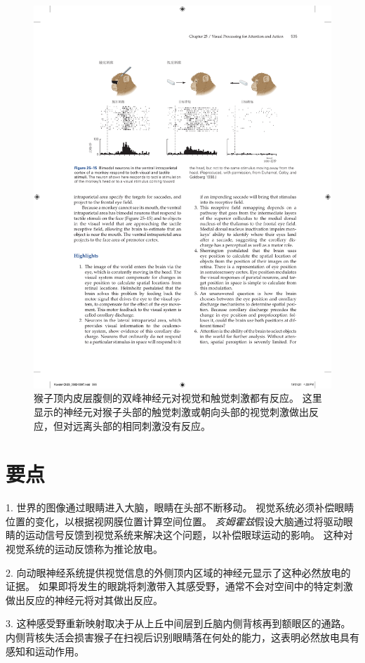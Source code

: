 \begin{figure}[htbp]
	\centering
	\includegraphics[width=0.85\linewidth]{chap25/fig_25_15}
	\caption{猴子顶内皮层腹侧的双峰神经元对视觉和触觉刺激都有反应。
		这里显示的神经元对猴子头部的触觉刺激或朝向头部的视觉刺激做出反应，但对远离头部的相同刺激没有反应。}
	\label{fig:25_15}
\end{figure}



\section{要点}

1. 世界的图像通过眼睛进入大脑，眼睛在头部不断移动。
视觉系统必须补偿眼睛位置的变化，以根据视网膜位置计算空间位置。
\textit{亥姆霍兹}假设大脑通过将驱动眼睛的运动信号反馈到视觉系统来解决这个问题，以补偿眼球运动的影响。
这种对视觉系统的运动反馈称为推论放电。


2. 向动眼神经系统提供视觉信息的外侧顶内区域的神经元显示了这种必然放电的证据。
如果即将发生的眼跳将刺激带入其感受野，通常不会对空间中的特定刺激做出反应的神经元将对其做出反应。


3. 这种感受野重新映射取决于从上丘中间层到丘脑内侧背核再到额眼区的通路。
内侧背核失活会损害猴子在扫视后识别眼睛落在何处的能力，这表明必然放电具有感知和运动作用。


